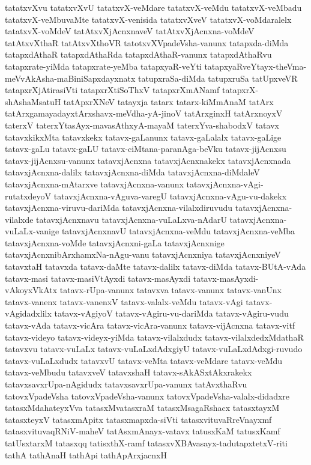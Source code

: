 {tatatxvXvu
tatatxvXvU
tatatxvX-veMdare
tatatxvX-veMdu
tatatxvX-veMbadu
tatatxvX-veMbuvaMte
tatatxvX-venisida
tatatxvXveV
tatatxvX-voMdaralelx
tatatxvX-voMdeV
tatAtxvXjAcnxnaveV
tatAtxvXjAcnxna-voMdeV
tatAtxvXthaR
tatAtxvXthoVR
tatotxvXVpadeVsha-vanunx
tatapxda-diMda
tatapxdAthaR
tatapxdAthaRda
tatapxdAthaR-vanunx
tatapxdAthaRvu
tatapxrate-yiMda
tatapxrate-yeMba
tatapxyaR-veYti
tatapxyaRveYtayx-theVma-meVvAkAsha-maBiniSapxdayxnatx
tatupxraSa-diMda
tatupxruSa
tatUpxveVR
tatapxrXjAtirasiVti
tatapxrXtiSoThxV
tatapxrXmANamf
tatapxrX-shAshaMsatuH
tatApxrXNeV
tatayxja
tatarx
tatarx-kiMmAnaM
tatArx
tatArxgamayadayxtArxshavx-meVdha-yA-jinoV
tatArxginxH
tatArxnoyxV
taterxV
taterxYtasAyx-mavasAthxyA-mayaM
taterxYva-shabodxV
tatavx
tatavxkikxMta
tatavxkekx
tatavx-gaLanunx
tatavx-gaLalalx
tatavx-gaLige
tatavx-gaLu
tatavx-gaLU
tatavx-ciMtana-paranAga-beVku
tatavx-jijAcnxsu
tatavx-jijAcnxsu-vanunx
tatavxjAcnxna
tatavxjAcnxnakekx
tatavxjAcnxnada
tatavxjAcnxna-dalilx
tatavxjAcnxna-diMda
tatavxjAcnxna-diMdaleV
tatavxjAcnxna-mAtarxve
tatavxjAcnxna-vanunx
tatavxjAcnxna-vAgi-rutatxdeyoV
tatavxjAcnxna-vAguva-varegU
tatavxjAcnxna-vAgu-vu-dakekx
tatavxjAcnxna-viruvu-dariMda
tatavxjAcnxna-vilalxdiruvudu
tatavxjAcnxna-vilalxde
tatavxjAcnxnavu
tatavxjAcnxna-vuLaLxva-nAdarU
tatavxjAcnxna-vuLaLx-vanige
tatavxjAcnxnavU
tatavxjAcnxna-veMdu
tatavxjAcnxna-veMba
tatavxjAcnxna-voMde
tatavxjAcnxni-gaLa
tatavxjAcnxnige
tatavxjAcnxnibArxhamxNa-nAgu-vanu
tatavxjAcnxniya
tatavxjAcnxniyeV
tatavxtaH
tatavxda
tatavx-daMte
tatavx-dalilx
tatavx-diMda
tatavx-BUtA-vAda
tatavx-masi
tatavx-masiVtAyxdi
tatavx-masAyxdi
tatavx-masAyxdi-vAkoyxVkAtx
tatavx-rUpa-vanunx
tatavxva
tatavx-vanunx
tatavx-vanUnx
tatavx-vanenx
tatavx-vanenxV
tatavx-valalx-veMdu
tatavx-vAgi
tatavx-vAgidadxlilx
tatavx-vAgiyoV
tatavx-vAgiru-vu-dariMda
tatavx-vAgiru-vudu
tatavx-vAda
tatavx-vicAra
tatavx-vicAra-vanunx
tatavx-vijAcnxna
tatavx-vitf
tatavx-videyo
tatavx-videyx-yiMda
tatavx-vilalxdudx
tatavx-vilalxdedxMdathaR
tatavxvu
tatavx-vuLaLx
tatavx-vuLaLxdAdxgiyU
tatavx-vuLaLxdAdxgi-ruvudo
tatavx-vuLaLxdudx
tatavxvU
tatavx-veMta
tatavx-veMdare
tatavx-veMdu
tatavx-veMbudu
tatavxveV
tatavxshaH
tatavx-sAkASxtAkxrakekx
tatavxsavxrUpa-nAgidudx
tatavxsavxrUpa-vanunx
tatAvxthaRvu
tatovxVpadeVsha
tatovxVpadeVsha-vanunx
tatovxVpadeVsha-valalx-didadxre
tatasxMdahateyxVva
tatasxMvatasxraM
tatasxMsagaRshacx
tatasxtayxM
tatasxteyxV
tatasxmApitx
tatasxmapxda-siVti
tatasxvituvaRreVnayxmf
tatasxvituvaqRNiV-maheV
tatAsxmAnayx-vatavx
tatusxKaM
tatusxKamf
tatUsxtarxM
tatasxqq
tatisxthX-ramf
tatasxvXBAvasayx-tadutapxtetxV-riti
tathA
tathAnaH
tathApi
tathApArxjacnxH
}

